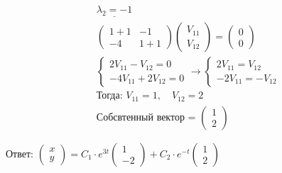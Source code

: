 \documentclass[14pt]{article}
\begin{document}
\begin{minipage}{.45\textwidth}
    \begin{align*}
        &\underline{\lambda_2 = -1}\\
        &\begin{pmatrix}
            1 + 1 & -1\\
            -4 & 1 + 1
        \end{pmatrix}
        \begin{pmatrix}
            V_{11}\\
            V_{12}
        \end{pmatrix}
        =
        \begin{pmatrix}
            0\\
            0
        \end{pmatrix}\\
        &\begin{cases}
            2V_{11}-V_{12}=0\\
            -4V_{11}+2V_{12}=0
        \end{cases}
        \rightarrow
        \begin{cases}
            2V_{11} = V_{12}\\
            -2V_{11} = -V_{12}
        \end{cases}\\
        &\text{Тогда: } V_{11} = 1, \quad V_{12} = 2\\
        &\text{Собсвтенный вектор = }
        \begin{pmatrix}
            1\\
            2
        \end{pmatrix}
    \end{align*}
\end{minipage}

Ответ: $
\begin{pmatrix}
    x\\
    y
\end{pmatrix}
= C_1 \cdot e^{3t}
\begin{pmatrix}
    1\\
    -2
\end{pmatrix}
+ C_2 \cdot e^{-t}
\begin{pmatrix}
    1\\
    2
\end{pmatrix}
$
\end{document}
